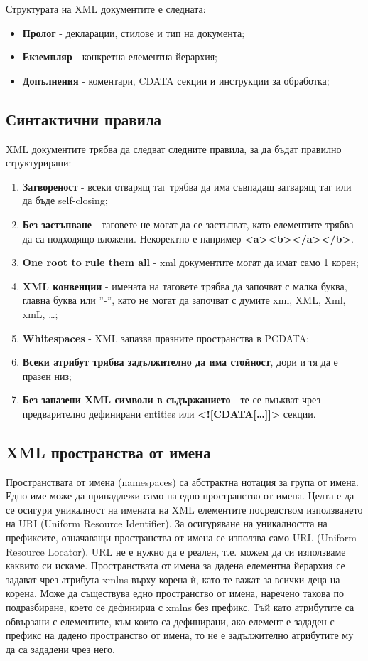 \documentclass[fleqn,12pt]{article}
\begin{document}
Структурата на XML документите е следната:
\begin{itemize}
    \item \textbf{Пролог} - декларации, стилове и тип на документа;
    \item \textbf{Екземпляр} - конкретна елементна йерархия;
    \item \textbf{Допълнения} - коментари, CDATA секции и инструкции за обработка;
\end{itemize}


\subsection{Синтактични правила}

XML документите трябва да следват следните правила, за да бъдат правилно структурирани:
\begin{enumerate}
    \item \textbf{Затвореност} - всеки отварящ таг трябва да има съвпадащ затварящ таг или да бъде self-closing;
    \item \textbf{Без застъпване} - таговете не могат да се застъпват, като елементите трябва да са подходящо вложени. Некоректно е например \textbf{<a><b></a></b>}.
    \item \textbf{One root to rule them all} - xml документите могат да имат само 1 корен;
    \item \textbf{XML конвенции} - имената на таговете трябва да започват с малка буква, главна буква или ''-'', като не могат да започват с думите xml, XML, Xml, xmL, \dots;
    \item \textbf{Whitespaces} - XML запазва празните пространства в PCDATA;
    \item \textbf{Всеки атрибут трябва задължително да има стойност}, дори и тя да е празен низ;
    \item \textbf{Без запазени XML символи в съдържанието} - те се вмъкват чрез предварително дефинирани entities или \textbf{<![CDATA[\dots]]>} секции.
\end{enumerate}

\subsection{XML пространства от имена}

Пространствата от имена (namespaces) са абстрактна нотация за група от имена.
Едно име може да принадлежи само на едно пространство от имена.
Целта е да се осигури уникалност на имената на XML елементите посредством използването на URI (Uniform Resource Identifier).
За осигуряване на уникалността на префиксите, означаващи пространства от имена се използва само URL (Uniform Resource Locator).
URL не е нужно да е реален, т.е. можем да си използваме каквито си искаме.
\bigbreak
Пространствата от имена за дадена елементна йерархия се задават чрез атрибута xmlns върху корена ѝ, като те важат за всички деца на корена.
Може да съществува едно пространство от имена, наречено такова по подразбиране, което се дефинириа с xmlns без префикс.
Тъй като атрибутите са обвързани с елементите, към които са дефинирани, ако елемент е зададен с префикс на дадено пространство от имена, то не е задължително атрибутите му да са зададени чрез него.
\end{document}
